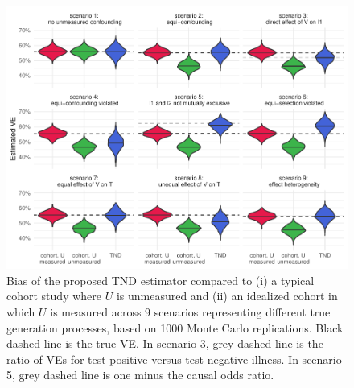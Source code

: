 \documentclass[11pt]{article}
\begin{document}
\begin{figure}
    \centering
    \includegraphics{sims.pdf}
    \caption{Bias of the proposed TND estimator compared to (i) a typical cohort study where $U$ is unmeasured and (ii) an idealized cohort in which $U$ is measured across 9 scenarios representing different true generation processes, based on 1000 Monte Carlo replications. Black dashed line is the true VE. In scenario 3, grey dashed line is the ratio of VEs for test-positive versus test-negative illness. In scenario 5, grey dashed line is one minus the causal odds ratio.}
    \label{fig:sims}
\end{figure}

\clearpage


\end{document}

